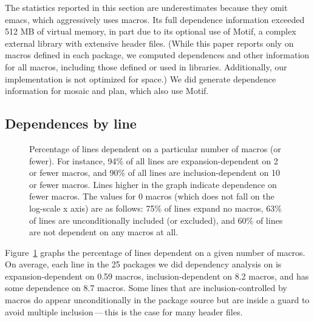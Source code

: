 \documentclass[10pt]{article}
\def\numdependpackages{25}
\newcommand{\pkg}[1]{\textsf{#1}}
\newcommand{\captionsmall}[1]{\caption[]{\small #1}}
\begin{document}
The statistics reported in this section are underestimates because they
omit \pkg{emacs}, which aggressively uses macros.  Its full dependence
information exceeded 512 MB of virtual memory, in part due to its optional use of Motif,
a complex external library with extensive header files.  (While this paper reports only on macros
defined in each package, we computed dependences and other information for
all macros, including those defined or used in libraries.  Additionally,
our implementation is not optimized for space.)  We did generate dependence
information for \pkg{mosaic} and \pkg{plan}, which also use Motif.


\subsection{Dependences by line}

\begin{figure}
\centerline{}
\captionsmall{Percentage of lines dependent on a particular number of macros (or
  fewer).  For instance, 94\% of all lines are expansion-dependent on 2
  or fewer macros, and 90\% of all lines are inclusion-dependent on 10 or
  fewer macros.  Lines higher in the graph indicate dependence on fewer
  macros.  The values for 0 macros (which does not fall on the log-scale x
  axis) are as follows:  75\% of lines expand no macros, 63\% of lines are
  unconditionally included (or excluded), and 60\% of lines are not
  dependent on any macros at all.}
\label{fig:dep-byline}
\end{figure}



Figure~\ref{fig:dep-byline} graphs the percentage of lines dependent on a
given number of macros.  On average, each line in the {\numdependpackages}
packages we did dependency analysis on is expansion-dependent on 0.59 macros, inclusion-dependent
on 8.2 macros, and has some dependence on 8.7 macros.  Some lines that are
inclusion-controlled by macros do appear unconditionally in the package
source but are inside a guard to avoid multiple inclusion\,---\,this is the
case for many header files.

\end{document}
